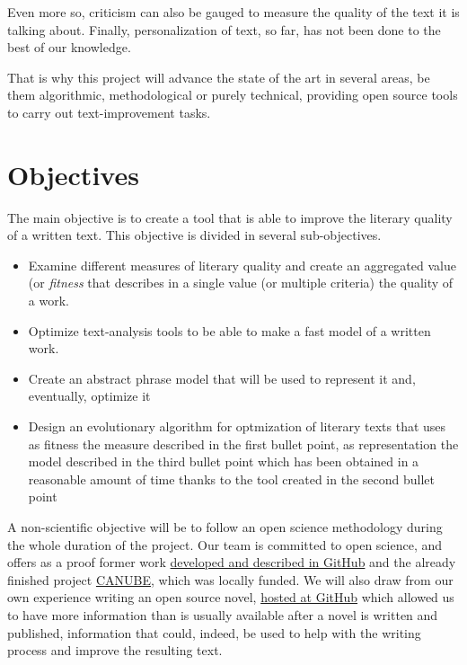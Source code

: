 \documentclass[a4paper,12pt,twocolumn]{article}
\begin{document}
Even more so, criticism can also be gauged to measure the
quality of the text it is talking about. Finally, personalization of
text, so far, has not been done to the best of our knowledge.

That is why this project will advance the state of the art in several
areas, be them algorithmic, methodological or purely technical,
providing open source tools to carry out text-improvement tasks. 

\section{Objectives}
\label{sec:obj}

The main objective is to create a tool that is able to improve the literary
quality of a written text. This objective is divided in several
sub-objectives. \begin{itemize}
\item Examine different measures of literary quality and create an
  aggregated value (or {\em fitness} that describes in a single value
  (or multiple criteria) the quality of a work.
\item Optimize text-analysis tools to be able to make a fast model of
  a written work.
\item Create an abstract phrase model that will be used to represent
  it and, eventually, optimize it
\item Design an evolutionary algorithm for optmization of literary
  texts that uses as fitness the measure described in the first bullet
  point, as representation the model described in the third bullet
  point which has been obtained in a reasonable amount of time thanks
  to the tool created in the second bullet point
\end{itemize}

A non-scientific objective will be to follow an open science
methodology during the whole duration of the project. Our team is
committed to open science, and offers as a proof former work \href{http://github.com/JJ}{developed
and described in GitHub} and the already finished project
\href{http://canube.wordpress.com}{CANUBE}, which was locally
funded. We will also draw from our own experience writing an open
source novel, \href{http://jj.github.io}{hosted at GitHub} which
allowed us to have more information than is usually available after a
novel is written and published, information that could, indeed, be
used to help with the writing process and improve the resulting text. 
\end{document}

